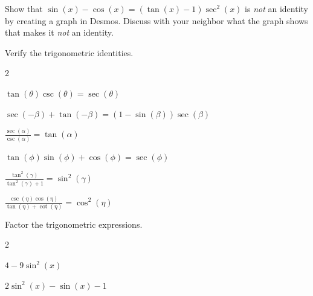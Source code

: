 \begin{myPractice}
	Show that $\sin(x)-\cos(x)=\left(\tan(x)-1\right)\sec^2(x)$ is \emph{not} an identity by creating a graph in Desmos. Discuss with your neighbor what the graph shows that makes it \emph{not} an identity.
\end{myPractice}

\begin{myPractice}
	Verify the trigonometric identities.
	\begin{enumerate}
	\end{enumerate}
\end{myPractice}
\vspace{6cm}


\begin{myPractice}
	Factor the trigonometric expressions.
	\begin{enumerate}
		\begin{multicols}{2}
			\item $4-9\sin^2(x)$
			\vfill
			\item $2\sin^2(x)-\sin(x)-1$
			\vfill
		\end{multicols}
	\end{enumerate}
\end{myPractice}
\vfill

\newpage

